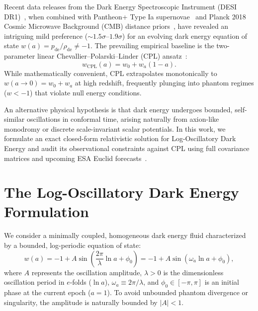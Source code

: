 Recent data releases from the Dark Energy Spectroscopic Instrument (DESI DR1)~\cite{desi2024}, when combined with Pantheon+ Type Ia supernovae~\cite{brout2022} and Planck 2018 Cosmic Microwave Background (CMB) distance priors~\cite{planck2018}, have revealed an intriguing mild preference ($\sim 1.5\sigma\text{--}1.9\sigma$) for an evolving dark energy equation of state $w(a) = p_{\mathrm{de}}/\rho_{\mathrm{de}} \ne -1$. The prevailing empirical baseline is the two-parameter linear Chevallier--Polarski--Linder (CPL) ansatz~\cite{chevallier2001,linder2003}:
\begin{equation}
w_{\mathrm{CPL}}(a) = w_0 + w_a(1 - a).
\label{eq:cpl}
\end{equation}
While mathematically convenient, CPL extrapolates monotonically to $w(a \to 0) = w_0 + w_a$ at high redshift, frequently plunging into phantom regimes ($w < -1$) that violate null energy conditions. 

An alternative physical hypothesis is that dark energy undergoes bounded, self-similar oscillations in conformal time, arising naturally from axion-like monodromy or discrete scale-invariant scalar potentials. In this work, we formulate an exact closed-form relativistic solution for Log-Oscillatory Dark Energy and audit its observational constraints against CPL using full covariance matrices and upcoming ESA Euclid forecasts~\cite{blanchard2020}.

\section{The Log-Oscillatory Dark Energy Formulation}
We consider a minimally coupled, homogeneous dark energy fluid characterized by a bounded, log-periodic equation of state:
\begin{equation}
w(a) = -1 + A \sin\left( \frac{2\pi}{\lambda} \ln a + \phi_0 \right) = -1 + A \sin(\omega_a \ln a + \phi_0),
\label{eq:log_osc}
\end{equation}
where $A$ represents the oscillation amplitude, $\lambda > 0$ is the dimensionless oscillation period in $e$-folds ($\ln a$), $\omega_a \equiv 2\pi / \lambda$, and $\phi_0 \in [-\pi, \pi]$ is an initial phase at the current epoch ($a = 1$). To avoid unbounded phantom divergence or singularity, the amplitude is naturally bounded by $|A| < 1$.

